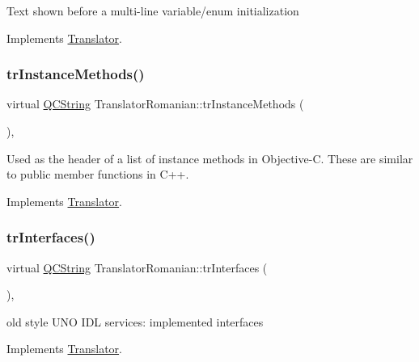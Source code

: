 Text shown before a multi-\/line variable/enum initialization 

Implements \mbox{\hyperlink{class_translator}{Translator}}.

\mbox{\label{class_translator_romanian_a8d5b235508f9aa7769c40b340f8e475f}} 
\subsubsection{\texorpdfstring{trInstanceMethods()}{trInstanceMethods()}}
{\footnotesize\ttfamily virtual \mbox{\hyperlink{class_q_c_string}{Q\+C\+String}} Translator\+Romanian\+::tr\+Instance\+Methods (\begin{DoxyParamCaption}{ }\end{DoxyParamCaption})\hspace{0.3cm}{\ttfamily [inline]}, {\ttfamily [virtual]}}

Used as the header of a list of instance methods in Objective-\/C. These are similar to public member functions in C++. 

Implements \mbox{\hyperlink{class_translator}{Translator}}.

\mbox{\label{class_translator_romanian_a244776b84b8f48539634938918177748}} 
\subsubsection{\texorpdfstring{trInterfaces()}{trInterfaces()}}
{\footnotesize\ttfamily virtual \mbox{\hyperlink{class_q_c_string}{Q\+C\+String}} Translator\+Romanian\+::tr\+Interfaces (\begin{DoxyParamCaption}{ }\end{DoxyParamCaption})\hspace{0.3cm}{\ttfamily [inline]}, {\ttfamily [virtual]}}

old style U\+NO I\+DL services\+: implemented interfaces 

Implements \mbox{\hyperlink{class_translator}{Translator}}.

\mbox{\label{class_translator_romanian_ade964f61707ef5a6e2b5812ffd79884c}} 
